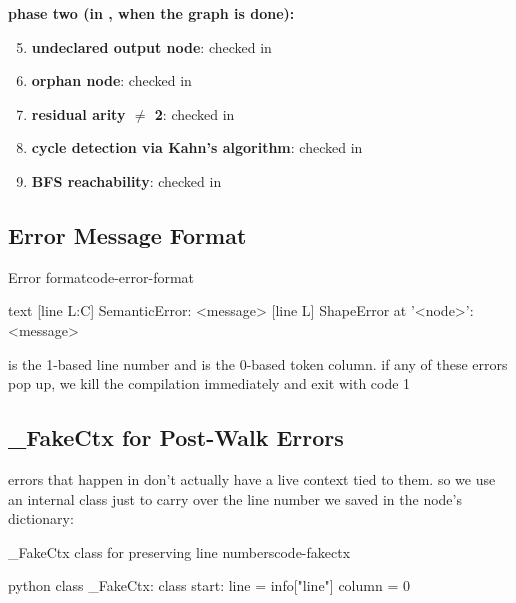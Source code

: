 \documentclass{nngraph-en}
\begin{document}
\textbf{phase two (in , when the graph is done):}
\begin{enumerate}
    \setcounter{enumi}{4}
    \item \textbf{undeclared output node}: checked in 
    \item \textbf{orphan node}: checked in 
    \item \textbf{residual arity $\neq$ 2}: checked in 
    \item \textbf{cycle detection via Kahn's algorithm}: checked in 
    \item \textbf{BFS reachability}: checked in 
\end{enumerate}

\subsection{Error Message Format}

\begin{codebox}{Error format}{code-error-format}
\begin{amzcode}{text}
[line L:C] SemanticError: <message>
[line L] ShapeError at '<node>': <message>
\end{amzcode}
\end{codebox}

 is the 1-based line number and  is the 0-based token column. if any of these errors pop up, we kill the compilation immediately and exit with code 1

\subsection{\_FakeCtx for Post-Walk Errors}

errors that happen in  don't actually have a live context tied to them. so we use an internal  class just to carry over the line number we saved in the node's dictionary:

\begin{codebox}{\_FakeCtx class for preserving line numbers}{code-fakectx}
\begin{amzcode}{python}
class _FakeCtx:
    class start:
        line   = info["line"]
        column = 0
\end{amzcode}
\end{codebox}
\end{document}

